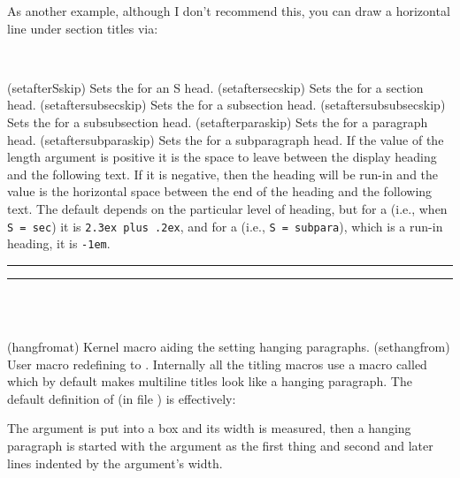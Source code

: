     As another example, although I don't recommend this, you can draw a
horizontal line under section titles via:
\begin{lcode}
\newcommand{\ruledsec}[1]{%
  \Large\bfseries\raggedright #1 \rule{\textwidth}{0.4pt}}
\end{lcode}


\begin{syntax}
\cmd{\setafterSskip} \\
\end{syntax}
\glossary(setafterSskip)%
  {}%
  {Sets the  for an S head.}
\glossary(setaftersecskip)%
  {}%
  {Sets the  for a section head.}
\glossary(setaftersubsecskip)%
  {}%
  {Sets the  for a subsection head.}
\glossary(setaftersubsubsecskip)%
  {}%
  {Sets the  for a subsubsection head.}
\glossary(setafterparaskip)%
  {}%
  {Sets the  for a paragraph head.}
\glossary(setaftersubparaskip)%
  {}%
  {Sets the  for a subparagraph head.}
If the value of the  length argument is positive it is the space
to leave between the display heading and the following text. If it is negative,
then the heading will be run-in and the value is the horizontal space
between the end of the heading and the following text.
The default  depends on the
particular level of heading, but for a \cmd{\section} (i.e., when
\verb?S = sec?) it is \verb?2.3ex plus .2ex?,
and for a \cmd{\subparagraph} (i.e., \verb?S = subpara?), which is a run-in
heading, it is \verb?-1em?.

\fancybreak{$*$}
\fancybreak{}

\begin{syntax}
\cmd{\@hangfrom} \\
\cmd{\sethangfrom} \\
\end{syntax}
\glossary(hangfromat)%
  {}%
  {Kernel macro aiding the setting hanging paragraphs.}
\glossary(sethangfrom)%
  {}%
  {User macro redefining  to .}
Internally all the titling macros use a macro called \cmd{\@hangfrom} which
by default makes multiline titles look like a hanging paragraph. The
default definition of \cmd{\@hangfrom} (in file ) is
effectively:
\begin{lcode}
\newcommand{\@hangfrom}[1]{\setbox\@tempboxa\hbox{{#1}}%
  \hangindent \wd\@tempboxa\noindent\box\@tempboxa}
\end{lcode}
The argument is put into a box and its width is measured, then a hanging
paragraph is started with the argument as the
first thing and second and later lines indented by the argument's width.

